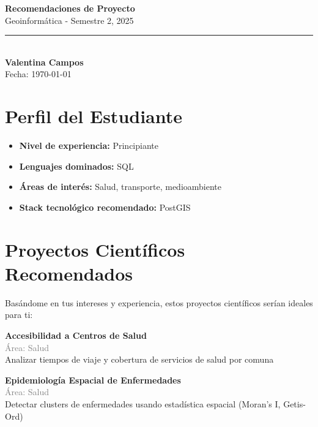 \documentclass[11pt,a4paper]{article}
\begin{document}
\begin{center}
    {\Huge \textbf{Recomendaciones de Proyecto}}\\[0.5cm]
    {\Large \textcolor{usachblue}{Geoinformática - Semestre 2, 2025}}\\[0.3cm]
    \rule{\textwidth}{0.5pt}\\[0.3cm]
    {\LARGE \textbf{Valentina Campos}}\\[0.2cm]
    {\large Fecha: \today}
\end{center}

\vspace{0.5cm}

\section*{ Perfil del Estudiante}

\begin{tcolorbox}[colback=blue!5,colframe=usachblue,title=Resumen de tu Perfil]
\begin{itemize}[leftmargin=*]
    \item \textbf{Nivel de experiencia:} Principiante
    \item \textbf{Lenguajes dominados:} SQL
    \item \textbf{Áreas de interés:} Salud, transporte, medioambiente
    \item \textbf{Stack tecnológico recomendado:} PostGIS
\end{itemize}
\end{tcolorbox}


\section*{ Proyectos Científicos Recomendados}

Basándome en tus intereses y experiencia, estos proyectos científicos serían ideales para ti:


\begin{tcolorbox}[colback=green!5,colframe=darkgreen,title={\small Proyecto Científico \#1}]
\textbf{Accesibilidad a Centros de Salud}\\[0.2cm]
\textcolor{gray}{\small Área: Salud}\\[0.2cm]
Analizar tiempos de viaje y cobertura de servicios de salud por comuna
\end{tcolorbox}


\begin{tcolorbox}[colback=green!5,colframe=darkgreen,title={\small Proyecto Científico \#2}]
\textbf{Epidemiología Espacial de Enfermedades}\\[0.2cm]
\textcolor{gray}{\small Área: Salud}\\[0.2cm]
Detectar clusters de enfermedades usando estadística espacial (Moran's I, Getis-Ord)
\end{tcolorbox}
\end{document}
